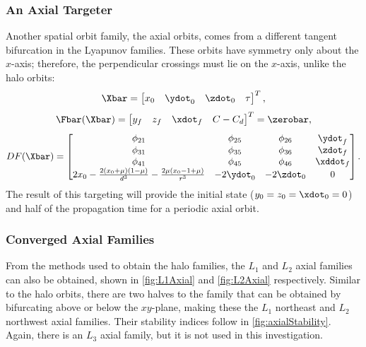 \subsubsection{An Axial Targeter}
Another spatial orbit family, the axial orbits, comes from a different tangent bifurcation in the
Lyapunov families. These orbits have symmetry only about the $x$-axis; therefore, the perpendicular
crossings must lie on the $x$-axis, unlike the halo orbits:
\begin{equation}
    \Xbar=\begin{bmatrix}   x_{0}   &   \ydot_{0}   &   \zdot_{0}   &   \tau    \end{bmatrix}^{T},
    \label{eq:axialfreevar}
\end{equation}
\begin{equation}
    \Fbar(\Xbar)=\begin{bmatrix}    y_{f}   &   z_{f}   &   \xdot_{f}   &   C-C_{d} \end{bmatrix}^{T}=\zerobar,
    \label{eq:axialconst}
\end{equation}
\begin{equation}
    DF(\Xbar)=\begin{bmatrix}   \phi_{21}                                                                   &   \phi_{25}   &   \phi_{26}   &   \ydot_{f}   \\
                                \phi_{31}                                                                   &   \phi_{35}   &   \phi_{36}   &   \zdot_{f}   \\
                                \phi_{41}                                                                   &   \phi_{45}   &   \phi_{46}   &   \xddot_{f}  \\
                                2x_{0}-\frac{2(x_{0}+\mu)(1-\mu)}{d^{3}}-\frac{2\mu(x_{0}-1+\mu)}{r^{3}}    &   -2\ydot_{0} &   -2\zdot_{0} &   0           \end{bmatrix}.
    \label{eq:axialjacobian}
\end{equation}
The result of this targeting will provide the initial state ($y_{0}=z_{0}=\xdot_{0}=0$) and half of
the propagation time for a periodic axial orbit.

\subsubsection{Converged Axial Families}
From the methods used to obtain the halo families, the $L_{1}$ and $L_{2}$ axial families can also
be obtained, shown in \cref{fig:L1Axial} and \cref{fig:L2Axial} respectively. Similar to the halo
orbits, there are two halves to the family that can be obtained by bifurcating above or below the
$xy$-plane, making these the $L_{1}$ northeast and $L_{2}$ northwest axial families. Their
stability indices follow in \cref{fig:axialStability}. Again, there is an $L_{3}$ axial family, but
it is not used in this investigation.

